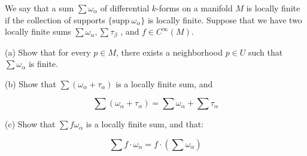 \documentclass[10pt]{article}
\theoremstyle{nonumberplain}%
\newenvironment{problem}[2][]{\begin{trivlist}
\item[\hskip \labelsep {\bfseries #1}\hskip \labelsep {\bfseries #2.}]}{\end{trivlist}}
\begin{document}
\begin{problem}{Question 2}

We say that a sum $\sum \omega_\alpha$ of differential $k$-forms on a manifold $M$ is locally finite if the collection of supports $\{ \text{supp} \: \omega_\alpha \}$ is locally finite. Suppose that we have two locally finite sums $\sum \omega_\alpha, \sum \tau_\beta$ , and $f \in C^\infty(M)$.

(a) Show that for every $p \in M$, there exists a neighborhood $p \in U$ such that $\sum \omega_\alpha$ is finite.

(b) Show that $\sum (\omega_\alpha + \tau_\alpha)$ is a locally finite sum, and

$$ \sum (\omega_\alpha + \tau_\alpha) = \sum \omega_\alpha + \sum \tau_\alpha$$

(c) Show that $\sum f\omega_\alpha$ is a locally finite sum, and that:

$$ \sum f \cdot \omega_\alpha = f \cdot \left( \sum \omega_\alpha\right) $$

\end{problem}
\end{document}
